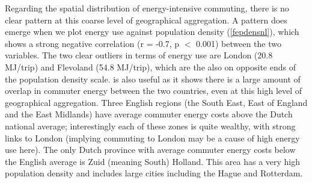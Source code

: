 \begin{table}[htbp]
\caption[Sample of the raw Dutch commuting data]
{Sample of the first 4 columns of the raw Dutch commuting data. A further 54
columns on the proportions travelling by and average time and distances of
trips by 9 modes of transport are not shown.}
\label{tdutch}
\end{table}

Regarding the spatial distribution of energy-intensive commuting,
there is no clear pattern at this coarse level of geographical aggregation.
A pattern does emerge when we plot energy use against
population density (\cref{fepdensnl}), which shows a strong negative correlation
(r = -0.7, p $<$ 0.001) between the two variables. The two clear outliers in
terms of energy use are London (20.8 MJ/trip) and Flevoland (54.8 MJ/trip),
which are the also on opposite ends of the population density scale.
 is also useful as it shows there is a large amount of
overlap in commuter energy between the two countries, even at this high
level of geographical aggregation. Three English regions
(the South East, East of England and the East Midlands) have average
commuter energy costs above the Dutch national average; interestingly
each of these zones is quite wealthy, with strong links to London
(implying commuting to London may be a cause of high energy use here).
The only Dutch province with average commuter energy costs below the
English average is Zuid (meaning South) Holland. This area has a very high
population density and includes large cities including the Hague and
Rotterdam.

